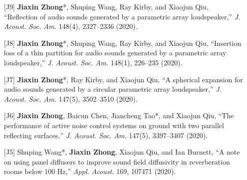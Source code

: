 \documentclass[10pt,a4paper,ragged2e,withhyper]{altacv}
\newcommand{\PubJournal}[1]{\textit{#1}}
\newcommand{\PubTitle}[1]{``{#1,}''}
\newcommand{\PubCorAuthor}[1]{#1*}
\begin{document}
\begin{itemize}[leftmargin = 30pt]
    \item[{[J9]}]
        \PubCorAuthor{\textbf{Jiaxin Zhong}}, Shuping Wang, Ray Kirby, and Xiaojun Qiu, 
        \PubTitle{Reflection of audio sounds generated by a parametric array loudspeaker} 
        \PubJournal{J. Acoust. Soc. Am.}
        148(4), 2327--2336 (2020).
        \href{https://doi.org/10.1121/10.0002161}{\color{accent}\aiDoi}
        \href{https://github.com/JiaxinZhong/JiaxinZhong.github.io/raw/master/publications/journal/Zhong2020-JASA-PAL_reflection.pdf}{\color{accent}\faFilePdf[regular]}

    \item[{[J8]}]
        \PubCorAuthor{\textbf{Jiaxin Zhong}}, Shuping Wang, Ray Kirby, and Xiaojun Qiu, 
        \PubTitle{Insertion loss of a thin partition for audio sounds generated by a parametric array loudspeaker}
        \PubJournal{J. Acoust. Soc. Am.}
        148(1), 226--235 (2020).
        \href{https://doi.org/10.1121/10.0001568}{\color{accent}\aiDoi}
        \href{https://github.com/JiaxinZhong/JiaxinZhong.github.io/raw/master/publications/journal/Zhong2020-JASA-PAL_insertion_loss.pdf}{\color{accent}\faFilePdf[regular]}

    \item[{[J7]}]
        \PubCorAuthor{\textbf{Jiaxin Zhong}}, Ray Kirby, and Xiaojun Qiu, 
        \PubTitle{A spherical expansion for audio sounds generated by a circular parametric array loudspeaker}
        \PubJournal{J. Acoust. Soc. Am.}
        147(5), 3502--3510 (2020).
        \href{https://doi.org/10.1121/10.0001261}{\color{accent}\aiDoi}
        \href{https://github.com/JiaxinZhong/JiaxinZhong.github.io/raw/master/publications/journal/Zhong2020-JASA-PAL_SWE.pdf}{\color{accent}\faFilePdf[regular]}

    \item[{[J6]}] \textbf{Jiaxin Zhong}, Baicun Chen, \PubCorAuthor{Jiancheng Tao}, and Xiaojun Qiu,
        \PubTitle{The performance of active noise control systems on ground with two parallel reflecting surfaces}
        \PubJournal{J. Acoust. Soc. Am.}
        147(5), 3397--3407 (2020).
        \href{https://doi.org/10.1121/10.0001227}{\color{accent}\aiDoi}
        \href{https://github.com/JiaxinZhong/JiaxinZhong.github.io/raw/master/publications/journal/Zhong2020-JASA-ANC_parallel_surface.pdf}{\color{accent}\faFilePdf[regular]}

    \item[{[J5]}] \PubCorAuthor{Shuping Wang}, \textbf{Jiaxin Zhong}, Xiaojun Qiu, and Ian Burnett, 
        \PubTitle{A note on using panel diffusers to improve sound field diffusivity in reverberation rooms below 100 Hz}
    \PubJournal{Appl. Acoust.} 
    169, 107471 (2020).
        \href{https://doi.org/10.1016/j.apacoust.2020.107471}{\color{accent}\aiDoi}
        \href{https://github.com/JiaxinZhong/JiaxinZhong.github.io/raw/master/publications/journal/Wang2020-AA-Diffuser.pdf}{\color{accent}\faFilePdf[regular]}


\end{itemize}
\end{document}
